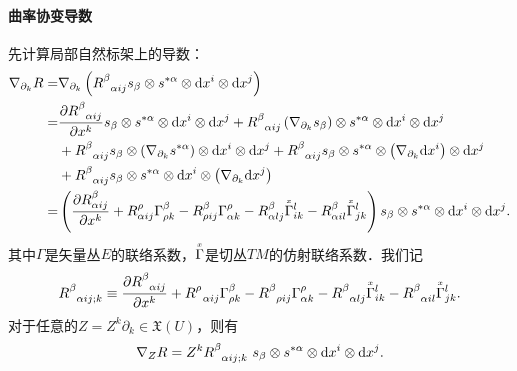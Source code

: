 \paragraph{曲率协变导数} 先计算局部自然标架上的导数：
\setlength{\mathindent}{0em}
\begin{align*}
	\nabla_{\partial_k} R = & \nabla_{\partial_k}\left(	R_{\hphantom{\alpha}\alpha i j}^\beta 
	s_\beta \otimes s^{*\alpha}\otimes {\rm d}x^i \otimes {\rm d}x^j \right) \\
	=& \frac{\partial R_{\hphantom{\alpha}\alpha i j}^\beta }{\partial x^k}
	s_\beta \otimes s^{*\alpha}\otimes {\rm d}x^i \otimes {\rm d}x^j 
	+ R_{\hphantom{\alpha}\alpha i j}^\beta \left( \nabla_{\partial_k} s_\beta \right)
	\otimes s^{*\alpha}\otimes {\rm d}x^i \otimes {\rm d}x^j \\
	& + R_{\hphantom{\alpha}\alpha i j}^\beta s_\beta \otimes 
	\left( \nabla_{\partial_k} s^{*\alpha} \right) \otimes {\rm d}x^i \otimes {\rm d}x^j 
	+ R_{\hphantom{\alpha}\alpha i j}^\beta s_\beta \otimes s^{*\alpha}\otimes  
	\left( \nabla_{\partial_k} {\rm d}x^i \right) \otimes  {\rm d}x^j \\
	&+ R_{\hphantom{\alpha}\alpha i j}^\beta s_\beta \otimes s^{*\alpha}\otimes {\rm d}x^i 
	\otimes \left( \nabla_{\partial_k} {\rm d}x^j \right) \\
	=&\left( \frac{\partial R_{\alpha i j}^\beta }{\partial x^k}
	+ R_{\alpha i j}^\rho \Gamma^\beta_{\rho k}
	- R_{\rho i j}^\beta \Gamma^\rho_{\alpha k}
	- R_{\alpha l j}^\beta \oversetmy{x}{\Gamma}^l_{i k}
	- R_{\alpha i l}^\beta \oversetmy{x}{\Gamma}^l_{j k}	\right)
	s_\beta \otimes s^{*\alpha}\otimes {\rm d}x^i \otimes {\rm d}x^j .
\end{align*}\setlength{\mathindent}{2em}
其中$\Gamma$是矢量丛$E$的联络系数，$\oversetmy{x}{\Gamma}$是切丛$TM$的仿射联络系数．我们记
\begin{equation}\label{chfb:eqn_RijDk}
	 R_{\hphantom{\alpha}\alpha i j ; k}^\beta \equiv 
	\frac{\partial R_{\hphantom{\alpha}\alpha i j}^\beta }{\partial x^k}
	+ R_{\hphantom{\alpha}\alpha i j}^\rho \Gamma^\beta_{\rho k}
	- R_{\hphantom{\alpha}\rho i j}^\beta \Gamma^\rho_{\alpha k}
	- R_{\hphantom{\alpha}\alpha l j}^\beta \oversetmy{x}{\Gamma}^l_{i k}
	- R_{\hphantom{\alpha}\alpha i l}^\beta \oversetmy{x}{\Gamma}^l_{j k} .
\end{equation}
对于任意的$ Z = Z^k \partial_k \in \mathfrak{X}(U)$，则有
\begin{equation}\label{chfb:eqn_DZR}
	\nabla_{Z} R = Z^k R_{\hphantom{\alpha}\alpha i j ; k}^\beta \ 
	s_\beta \otimes s^{*\alpha}\otimes {\rm d}x^i \otimes {\rm d}x^j .
\end{equation}

